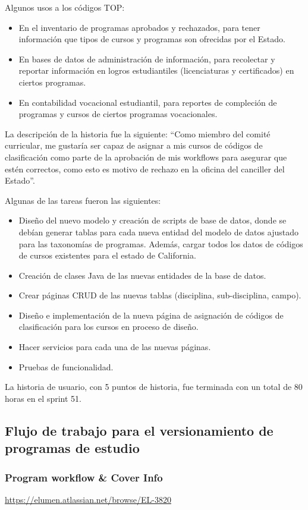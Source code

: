 Algunos usos a los códigos TOP:
\begin{itemize}
	\item En el inventario de programas aprobados y rechazados, para tener información que tipos de cursos y programas son ofrecidas por el Estado.
	\item En bases de datos de administración de información, para recolectar y reportar información en logros estudiantiles (licenciaturas y certificados) en ciertos programas.
	\item En contabilidad vocacional estudiantil, para reportes de compleción de programas y cursos de ciertos programas vocacionales.
\end{itemize}

La descripción de la historia fue la siguiente: “Como miembro del comité curricular, me gustaría ser capaz de asignar a mis cursos de códigos de clasificación como parte de la aprobación de mis workflows para asegurar que estén correctos, como esto es motivo de rechazo en la oficina del canciller del Estado”.

Algunas de las tareas fueron las siguientes:
\begin{itemize}
	\item Diseño del nuevo modelo y creación de scripts de base de datos, donde se debían generar tablas para cada nueva entidad del modelo de datos ajustado para las taxonomías de programas. Además, cargar todos los datos de códigos de cursos existentes para el estado de California.
	\item Creación de clases Java de las nuevas entidades de la base de datos.
	\item Crear páginas CRUD de las nuevas tablas (disciplina, sub-disciplina, campo).
	\item Diseño e implementación de la nueva página de asignación de códigos de clasificación para los cursos en proceso de diseño.
	\item Hacer servicios para cada una de las nuevas páginas.
	\item Pruebas de funcionalidad.
\end{itemize}

La historia de usuario, con 5 puntos de historia, fue terminada con un total de 80 horas en el sprint 51.


\subsection{Flujo de trabajo para el versionamiento de programas de estudio}
\subsubsection{Program workflow \& Cover Info}
\url{https://elumen.atlassian.net/browse/EL-3820}

